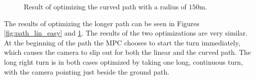 \begin{figure}
	\caption{Result of optimizing the curved path with a radius of $150$m.}
	\label{fig:path_cur_easy}
\end{figure}

The results of optimizing the longer path can be seen in Figures \ref{fig:path_lin_easy} and \ref{fig:path_cur_easy}. The results of the two optimizations are very similar. At the beginning of the path the MPC chooses to start the turn immediately, which causes the camera to slip out for both the linear and the curved path. The long right turn is in both cases optimized by taking one long, continuous turn, with the camera pointing just beside the ground path.